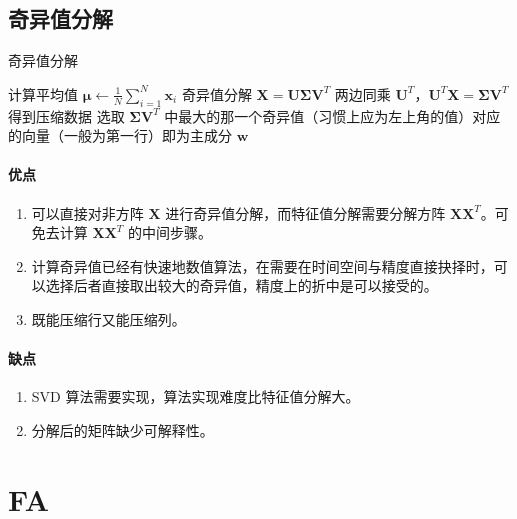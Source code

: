     \subsection{奇异值分解}

    \begin{algorithm}
        \caption{奇异值分解}
        \BlankLine
        计算平均值 $\mathbf{\mu}\leftarrow\frac{1}{N}\sum_{i=1}^N \mathbf{x}_i$\;
        奇异值分解 $\mathbf{X}=\mathbf{U}\mathbf{\Sigma}\mathbf{V}^T$\;
        两边同乘 $\mathbf{U}^T$，$\mathbf{U}^T\mathbf{X}=\mathbf{\Sigma}\mathbf{V}^T$ 得到压缩数据\;
        选取 $\mathbf{\Sigma}\mathbf{V}^T$ 中最大的那一个奇异值（习惯上应为左上角的值）对应的向量（一般为第一行）即为主成分 $\mathbf{w}$\;
        \;
    \end{algorithm}

    \paragraph{优点} 
    \begin{enumerate}
        \item 可以直接对非方阵 $\mathbf{X}$ 进行奇异值分解，而特征值分解需要分解方阵 $\mathbf{X}\mathbf{X}^T$。可免去计算 $\mathbf{X}\mathbf{X}^T$ 的中间步骤。
        \item 计算奇异值已经有快速地数值算法，在需要在时间空间与精度直接抉择时，可以选择后者直接取出较大的奇异值，精度上的折中是可以接受的。
        \item 既能压缩行又能压缩列。
    \end{enumerate}

    \paragraph{缺点} 

    \begin{enumerate}
        \item SVD 算法需要实现，算法实现难度比特征值分解大。
        \item 分解后的矩阵缺少可解释性。
    \end{enumerate}

    \section{FA}

